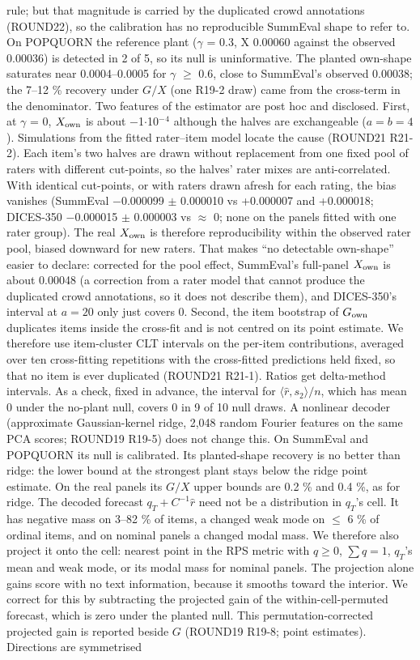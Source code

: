 \documentclass{article}
\begin{document}
rule; but that magnitude is carried by the duplicated crowd annotations (ROUND22), so the calibration has no reproducible SummEval shape to refer to. On POPQUORN the reference plant ($\gamma$ = 0.3, X 0.00060 against the observed 0.00036) is detected in 2 of 5, so its null is uninformative. The planted own-shape saturates near 0.0004--0.0005 for $\gamma$ $\geq$ 0.6, close to SummEval's observed 0.00038; the 7--12 \% recovery under \(G/X\) (one R19-2 draw) came from the cross-term in the denominator. Two features of the estimator are post hoc and disclosed. First, at $\gamma$ = 0, \(X_{\rm own}\) is about $-$1$\cdot$10$^{-}$$^{4}$ although the halves are exchangeable (\(a=b=4\)). Simulations from the fitted rater--item model locate the cause (ROUND21 R21-2). Each item's two halves are drawn without replacement from one fixed pool of raters with different cut-points, so the halves' rater mixes are anti-correlated. With identical cut-points, or with raters drawn afresh for each rating, the bias vanishes (SummEval $-$0.000099 $\pm$ 0.000010 vs +0.000007 and +0.000018; DICES-350 $-$0.000015 $\pm$ 0.000003 vs $\approx$ 0; none on the panels fitted with one rater group). The real \(X_{\rm own}\) is therefore reproducibility within the observed rater pool, biased downward for new raters. That makes ``no detectable own-shape'' easier to declare: corrected for the pool effect, SummEval's full-panel \(X_{\rm own}\) is about 0.00048 (a correction from a rater model that cannot produce the duplicated crowd annotations, so it does not describe them), and DICES-350's interval at \(a=20\) only just covers 0. Second, the item bootstrap of \(G_{\rm own}\) duplicates items inside the cross-fit and is not centred on its point estimate. We therefore use item-cluster CLT intervals on the per-item contributions, averaged over ten cross-fitting repetitions with the cross-fitted predictions held fixed, so that no item is ever duplicated (ROUND21 R21-1). Ratios get delta-method intervals. As a check, fixed in advance, the interval for \(\langle\hat r,s_2\rangle/n\), which has mean 0 under the no-plant null, covers 0 in 9 of 10 null draws. A nonlinear decoder (approximate Gaussian-kernel ridge, 2,048 random Fourier features on the same PCA scores; ROUND19 R19-5) does not change this. On SummEval and POPQUORN its null is calibrated. Its planted-shape recovery is no better than ridge: the lower bound at the strongest plant stays below the ridge point estimate. On the real panels its \(G/X\) upper bounds are 0.2 \% and 0.4 \%, as for ridge. The decoded forecast \(q_T + C^{-1}\hat r\) need not be a distribution in \(q_T\)'s cell. It has negative mass on 3--82 \% of items, a changed weak mode on $\leq$ 6 \% of ordinal items, and on nominal panels a changed modal mass. We therefore also project it onto the cell: nearest point in the RPS metric with \(q\ge0\), \(\sum q=1\), \(q_T\)'s mean and weak mode, or its modal mass for nominal panels. The projection alone gains score with no text information, because it smooths toward the interior. We correct for this by subtracting the projected gain of the within-cell-permuted forecast, which is zero under the planted null. This permutation-corrected projected gain is reported beside \(G\) (ROUND19 R19-8; point estimates). Directions are symmetrised 
\end{document}
